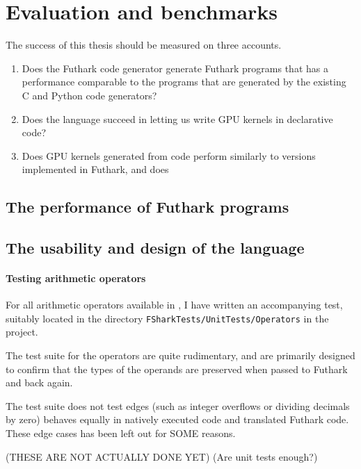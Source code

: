 \chapter{Evaluation and benchmarks}
The success of this thesis should be measured on three accounts.
\begin{enumerate}
\item Does the Futhark \csharp{} code generator generate Futhark \csharp{}
  programs that has a performance comparable to the programs that are
  generated by the existing C and Python code generators?

\item Does the \fshark{} language succeed in letting us write GPU kernels in
  declarative \fsharp{} code?
  
\item Does GPU kernels generated from \fshark{} code perform similarly to
  versions implemented in Futhark, and does
\end{enumerate}


\section{The performance of Futhark \csharp{} programs}




\section{The usability and design of the \fshark{} language}

\subsubsection*{Testing arithmetic operators}
For all arithmetic operators available in \fshark{}, I have written an
accompanying test, suitably located in the directory
\texttt{FSharkTests/UnitTests/Operators} in the \fshark{} project.

The test suite for the operators are quite rudimentary, and are primarily
designed to confirm that the types of the operands are preserved when passed to
Futhark \csharp{} and back again.

The test suite does not test edges (such as integer overflows or dividing
decimals by zero) behaves equally in natively executed \fshark{} code and
translated Futhark \csharp{} code.
These edge cases has been left out for SOME reasons.

(THESE ARE NOT ACTUALLY DONE YET)
(Are unit tests enough?)

